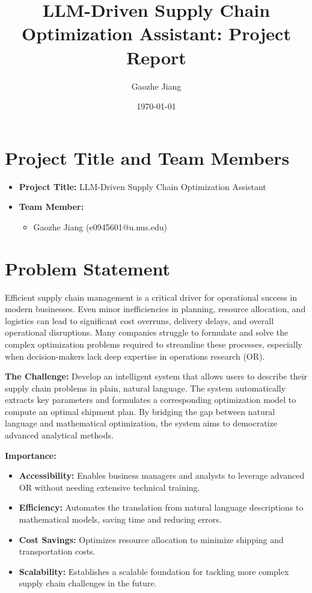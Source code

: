 \documentclass[11pt]{article}
\title{LLM-Driven Supply Chain Optimization Assistant: Project Report}
\author{Gaozhe Jiang}
\date{\today}
\begin{document}
\maketitle

\tableofcontents
\newpage

\section{Project Title and Team Members}
\begin{itemize}
    \item \textbf{Project Title:} LLM-Driven Supply Chain Optimization Assistant
    \item \textbf{Team Member:}
    \begin{itemize}
        \item Gaozhe Jiang (e0945601@u.nus.edu)
    \end{itemize}
\end{itemize}

\section{Problem Statement}
Efficient supply chain management is a critical driver for operational success in modern businesses. Even minor inefficiencies in planning, resource allocation, and logistics can lead to significant cost overruns, delivery delays, and overall operational disruptions. Many companies struggle to formulate and solve the complex optimization problems required to streamline these processes, especially when decision-makers lack deep expertise in operations research (OR).

\textbf{The Challenge:}  
Develop an intelligent system that allows users to describe their supply chain problems in plain, natural language. The system automatically extracts key parameters and formulates a corresponding optimization model to compute an optimal shipment plan. By bridging the gap between natural language and mathematical optimization, the system aims to democratize advanced analytical methods.

\textbf{Importance:}
\begin{itemize}
    \item \textbf{Accessibility:} Enables business managers and analysts to leverage advanced OR without needing extensive technical training.
    \item \textbf{Efficiency:} Automates the translation from natural language descriptions to mathematical models, saving time and reducing errors.
    \item \textbf{Cost Savings:} Optimizes resource allocation to minimize shipping and transportation costs.
    \item \textbf{Scalability:} Establishes a scalable foundation for tackling more complex supply chain challenges in the future.
\end{itemize}
\end{document}
